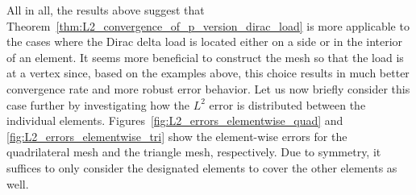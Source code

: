 \documentclass[english, 12pt, a4paper, sci, utf8, a-2b, online]{aaltothesis}
\theoremstyle{definition}
\theoremstyle{plain}
\numberwithin{equation}{section}
\begin{document}
All in all, the results above suggest that Theorem~\ref{thm:L2_convergence_of_p_version_dirac_load}
is more applicable to the cases where the Dirac delta load is located either on a side or
in the interior of an element. It seems more beneficial to construct the mesh so that
the load is at a vertex since, based on the examples above, this choice results in much
better convergence rate and more robust error behavior.
Let us now briefly consider this case further by
investigating how the $L^2$ error is distributed between the individual elements.
Figures~\ref{fig:L2_errors_elementwise_quad} and \ref{fig:L2_errors_elementwise_tri}
show the element-wise errors for the quadrilateral mesh and the triangle mesh, respectively.
Due to symmetry, it suffices to only consider the designated elements to cover
the other elements as well.
\end{document}
